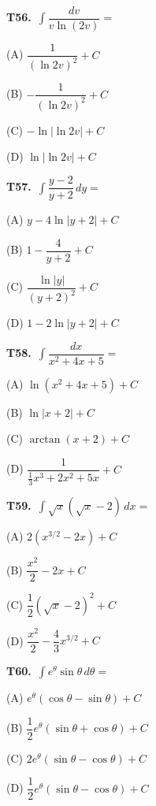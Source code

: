 \documentclass[11pt]{article}
\begin{document}
\bigskip\noindent\textbf{T56.}\ $\displaystyle\int \dfrac{dv}{v\ln(2v)} =$
\begin{list}{}{\setlength{\leftmargin}{3em}\setlength{\labelwidth}{2.5em}\setlength{\itemsep}{0pt}\setlength{\topsep}{2pt}}
\item[(A)] $\dfrac{1}{(\ln 2v)^2}+C$
\item[(B)] $-\dfrac{1}{(\ln 2v)^2}+C$
\item[(C)] $-\ln|\ln 2v|+C$
\item[(D)] $\ln|\ln 2v|+C$
\end{list}

\bigskip\noindent\textbf{T57.}\ $\displaystyle\int \dfrac{y-2}{y+2}\,dy =$
\begin{list}{}{\setlength{\leftmargin}{3em}\setlength{\labelwidth}{2.5em}\setlength{\itemsep}{0pt}\setlength{\topsep}{2pt}}
\item[(A)] $y-4\ln|y+2|+C$
\item[(B)] $1-\dfrac{4}{y+2}+C$
\item[(C)] $\dfrac{\ln|y|}{(y+2)^2}+C$
\item[(D)] $1-2\ln|y+2|+C$
\end{list}

\bigskip\noindent\textbf{T58.}\ $\displaystyle\int \dfrac{dx}{x^2+4x+5} =$
\begin{list}{}{\setlength{\leftmargin}{3em}\setlength{\labelwidth}{2.5em}\setlength{\itemsep}{0pt}\setlength{\topsep}{2pt}}
\item[(A)] $\ln(x^2+4x+5)+C$
\item[(B)] $\ln|x+2|+C$
\item[(C)] $\arctan(x+2)+C$
\item[(D)] $\dfrac{1}{\frac{1}{3}x^3+2x^2+5x}+C$
\end{list}

\bigskip\noindent\textbf{T59.}\ $\displaystyle\int \sqrt{x}(\sqrt{x}-2)\,dx =$
\begin{list}{}{\setlength{\leftmargin}{3em}\setlength{\labelwidth}{2.5em}\setlength{\itemsep}{0pt}\setlength{\topsep}{2pt}}
\item[(A)] $2(x^{3/2}-2x)+C$
\item[(B)] $\dfrac{x^2}{2}-2x+C$
\item[(C)] $\dfrac{1}{2}(\sqrt{x}-2)^2+C$
\item[(D)] $\dfrac{x^2}{2}-\dfrac{4}{3}x^{3/2}+C$
\end{list}

\bigskip\noindent\textbf{T60.}\ $\displaystyle\int e^\theta\sin\theta\,d\theta =$
\begin{list}{}{\setlength{\leftmargin}{3em}\setlength{\labelwidth}{2.5em}\setlength{\itemsep}{0pt}\setlength{\topsep}{2pt}}
\item[(A)] $e^\theta(\cos\theta-\sin\theta)+C$
\item[(B)] $\dfrac{1}{2}e^\theta(\sin\theta+\cos\theta)+C$
\item[(C)] $2e^\theta(\sin\theta-\cos\theta)+C$
\item[(D)] $\dfrac{1}{2}e^\theta(\sin\theta-\cos\theta)+C$
\end{list}
\end{document}
